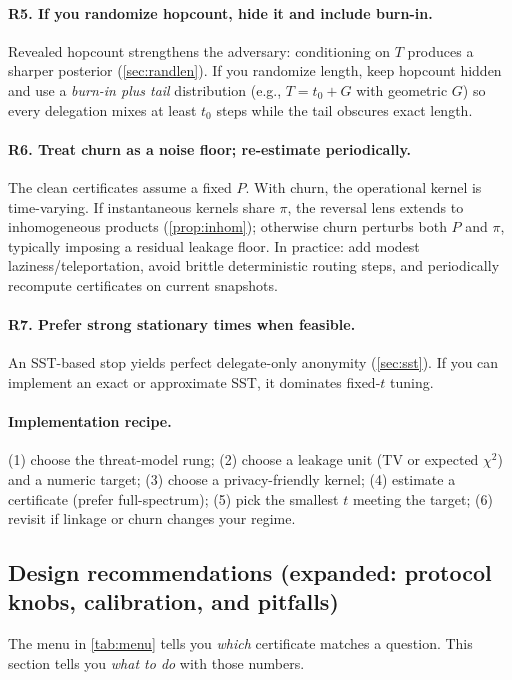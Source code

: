 \documentclass[11pt]{article}
\begin{document}
\paragraph{R5. If you randomize hopcount, hide it and include burn-in.}
Revealed hopcount strengthens the adversary: conditioning on $T$ produces a
sharper posterior (\cref{sec:randlen}). If you randomize length, keep hopcount
hidden and use a \emph{burn-in plus tail} distribution (e.g., $T=t_0+G$ with
geometric $G$) so every delegation mixes at least $t_0$ steps while the tail
obscures exact length.

\paragraph{R6. Treat churn as a noise floor; re-estimate periodically.}
The clean certificates assume a fixed $P$. With churn, the operational kernel is
time-varying. If instantaneous kernels share $\pi$, the reversal lens extends to
inhomogeneous products (\cref{prop:inhom}); otherwise churn perturbs both $P$ and
$\pi$, typically imposing a residual leakage floor. In practice: add modest
laziness/teleportation, avoid brittle deterministic routing steps, and
periodically recompute certificates on current snapshots.

\paragraph{R7. Prefer strong stationary times when feasible.}
An SST-based stop yields perfect delegate-only anonymity (\cref{sec:sst}). If you
can implement an exact or approximate SST, it dominates fixed-$t$ tuning.

\paragraph{Implementation recipe.}
(1) choose the threat-model rung; (2) choose a leakage unit (TV or expected
$\chi^2$) and a numeric target; (3) choose a privacy-friendly kernel; (4) estimate
a certificate (prefer full-spectrum); (5) pick the smallest $t$ meeting the
target; (6) revisit if linkage or churn changes your regime.



\subsection*{Design recommendations (expanded: protocol knobs, calibration, and pitfalls)}
The menu in \cref{tab:menu} tells you \emph{which} certificate matches a question. This section tells you
\emph{what to do} with those numbers.
\end{document}
